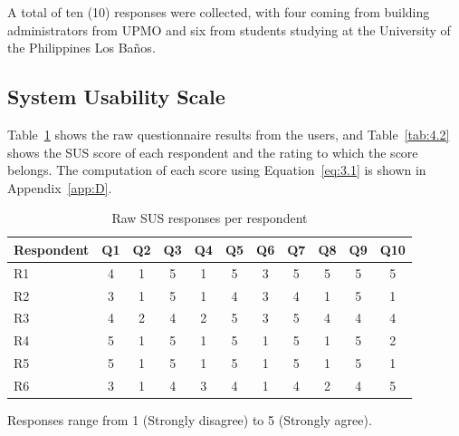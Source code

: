 A total of ten (10) responses were collected, with four coming from building
administrators from UPMO and six from students studying at the University of the
Philippines Los Baños.

\subsection{System Usability Scale}\label{sec:4.7.1}

Table~\ref{tab:4.1} shows the raw questionnaire results from the users, and
Table~\ref{tab:4.2} shows the SUS score of each respondent and the rating to
which the score belongs. The computation of each score using
Equation~\ref{eq:3.1} is shown in Appendix~\ref{app:D}.

\begin{table}[htbp]
\centering
\singlespacing
\caption{Raw SUS responses per respondent}\label{tab:4.1}
\renewcommand{\arraystretch}{1.15}
\begin{tabular}{lcccccccccc}
\toprule
\textbf{Respondent} & \textbf{Q1} & \textbf{Q2} & \textbf{Q3} & \textbf{Q4} & \textbf{Q5} & \textbf{Q6} & \textbf{Q7} & \textbf{Q8} & \textbf{Q9} & \textbf{Q10} \\
\midrule
R1 & 4 & 1 & 5 & 1 & 5 & 3 & 5 & 5 & 5 & 5 \\
R2 & 3 & 1 & 5 & 1 & 4 & 3 & 4 & 1 & 5 & 1 \\
R3 & 4 & 2 & 4 & 2 & 5 & 3 & 5 & 4 & 4 & 4 \\
R4 & 5 & 1 & 5 & 1 & 5 & 1 & 5 & 1 & 5 & 2 \\
R5 & 5 & 1 & 5 & 1 & 5 & 1 & 5 & 1 & 5 & 1 \\
R6 & 3 & 1 & 4 & 3 & 4 & 1 & 4 & 2 & 4 & 5 \\
\bottomrule
\end{tabular}
\par\vspace{4pt}
{\footnotesize\raggedright\setlength{\parindent}{0pt}Responses range from 1 (Strongly disagree) to 5 (Strongly agree).\par}
\end{table}

